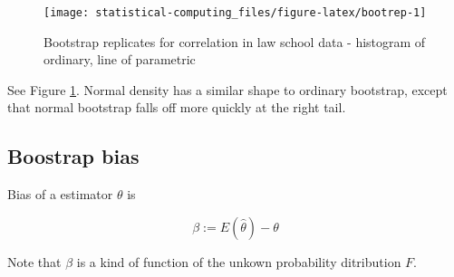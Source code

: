 \documentclass[]{book}
\newenvironment{Shaded}{\begin{snugshade}}{\end{snugshade}}
\newcommand{\DataTypeTok}[1]{\textcolor[rgb]{0.13,0.29,0.53}{#1}}
\newcommand{\DecValTok}[1]{\textcolor[rgb]{0.00,0.00,0.81}{#1}}
\newcommand{\KeywordTok}[1]{\textcolor[rgb]{0.13,0.29,0.53}{\textbf{#1}}}
\newcommand{\NormalTok}[1]{#1}
\newcommand{\OperatorTok}[1]{\textcolor[rgb]{0.81,0.36,0.00}{\textbf{#1}}}
\newcommand{\StringTok}[1]{\textcolor[rgb]{0.31,0.60,0.02}{#1}}
\theoremstyle{definition}
\theoremstyle{definition}
\theoremstyle{definition}
\theoremstyle{remark}
\let\BeginKnitrBlock\begin \let\EndKnitrBlock\end
\begin{document}
\begin{Shaded}
\end{Shaded}

\begin{figure}[H]

{\centering \texttt{[image: statistical-computing\_files/figure-latex/bootrep-1]} 

}

\caption{Bootstrap replicates for correlation in law school data - histogram of ordinary, line of parametric}\label{fig:bootrep}
\end{figure}

See Figure \ref{fig:bootrep}. Normal density has a similar shape to ordinary bootstrap, except that normal bootstrap falls off more quickly at the right tail.

\hypertarget{boostrap-bias}{%
\subsection{Boostrap bias}\label{boostrap-bias}}

\BeginKnitrBlock{definition}[Bias]
\protect\hypertarget{def:biasdef}{}{\label{def:biasdef} {} }Bias of a estimator \(\theta\) is

\[\beta := E(\hat\theta) - \theta\]
\EndKnitrBlock{definition}

Note that \(\beta\) is a kind of function of the unkown probability ditribution \(F\).
\end{document}

